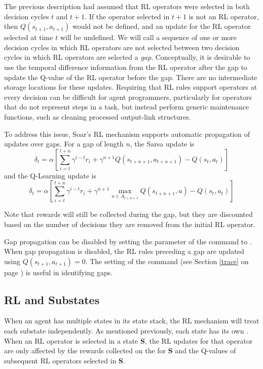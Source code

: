 The previous description had assumed that RL operators were selected in both decision cycles $t$ and $t+1$.
If the operator selected in $t+1$ is not an RL operator, then $Q(s_{t+1}, a_{t+1})$ would not be defined, and an update for the RL operator selected at time $t$ will be undefined.
We will call a sequence of one or more decision cycles in which RL operators are not selected between two decision cycles in which RL operators are selected a \emph{gap}.
Conceptually, it is desirable to use the temporal difference information from the RL operator after the gap to update the Q-value of the RL operator before the gap.
There are no intermediate storage locations for these updates.
Requiring that RL rules support operators at every decision can be difficult for agent programmers, particularly for operators that do not represent steps in a task, but instead perform generic maintenance functions, such as cleaning processed output-link structures.

To address this issue, Soar's RL mechanism supports automatic propagation of updates over gaps.
For a gap of length $n$, the Sarsa update is
$$\delta_t = \alpha \left[ \sum_{i=t}^{t+n}{\gamma^{i-t} r_i} + \gamma^{n+1} Q(s_{t+n+1}, a_{t+n+1}) - Q(s_t, a_t) \right]$$
and the Q-Learning update is
$$\delta_t = \alpha \left[ \sum_{i=t}^{t+n}{\gamma^{i-t} r_i} + \gamma^{n+1} \underset{a \in A_{t+n+1}}{\max} Q(s_{t+n+1}, a) - Q(s_t, a_t) \right]$$

Note that rewards will still be collected during the gap, but they are discounted based on the number of decisions they are removed from the initial RL operator.

Gap propagation can be disabled by setting the  parameter of the  command to .
When gap propagation is disabled, the RL rules preceding a gap are updated using $Q(s_{t+1}, a_{t+1}) = 0$.
The  setting of the  command (see Section \ref{trace} on page \pageref{trace}) is useful in identifying gaps.


\subsection{RL and Substates}
\label{RL-substates}

When an agent has multiple states in its state stack, the RL mechanism will treat each substate independently.
As mentioned previously, each state has its own .
When an RL operator is selected in a state \textbf{S}, the RL updates for that operator are only affected by the rewards collected on the  for \textbf{S} and the Q-values of subsequent RL operators selected in \textbf{S}.

